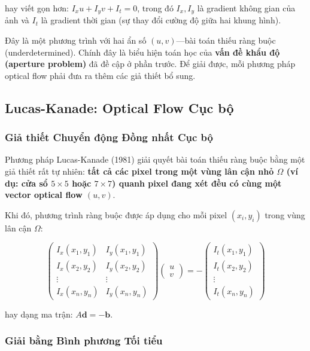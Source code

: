 hay viết gọn hơn: $I_x u + I_y v + I_t = 0$, trong đó $I_x, I_y$ là gradient không gian của ảnh và $I_t$ là gradient thời gian (sự thay đổi cường độ giữa hai khung hình).

Đây là một phương trình với hai ẩn số $(u, v)$—bài toán thiếu ràng buộc (underdetermined). Chính đây là biểu hiện toán học của \textbf{vấn đề khẩu độ (aperture problem)} đã đề cập ở phần trước. Để giải được, mỗi phương pháp optical flow phải đưa ra thêm các giả thiết bổ sung.

\subsection{Lucas-Kanade: Optical Flow Cục bộ}
\label{subsec:lucas_kanade}

\subsubsection{Giả thiết Chuyển động Đồng nhất Cục bộ}
\label{subsubsec:lk_assumption}

Phương pháp Lucas-Kanade (1981) \cite{Lucas1981} giải quyết bài toán thiếu ràng buộc bằng một giả thiết rất tự nhiên: \textbf{tất cả các pixel trong một vùng lân cận nhỏ $\Omega$ (ví dụ: cửa sổ $5 \times 5$ hoặc $7 \times 7$) quanh pixel đang xét đều có cùng một vector optical flow $(u, v)$}.

Khi đó, phương trình ràng buộc được áp dụng cho mỗi pixel $(x_i, y_i)$ trong vùng lân cận $\Omega$:

\[
    \begin{pmatrix}
        I_x(x_1, y_1) & I_y(x_1, y_1) \\
        I_x(x_2, y_2) & I_y(x_2, y_2) \\
        \vdots & \vdots \\
        I_x(x_n, y_n) & I_y(x_n, y_n)
    \end{pmatrix}
    \begin{pmatrix} u \\ v \end{pmatrix}
    =
    -\begin{pmatrix}
        I_t(x_1, y_1) \\
        I_t(x_2, y_2) \\
        \vdots \\
        I_t(x_n, y_n)
    \end{pmatrix}
\]

hay dạng ma trận: $A\mathbf{d} = -\mathbf{b}$.

\subsubsection{Giải bằng Bình phương Tối tiểu}
\label{subsubsec:lk_least_squares}


